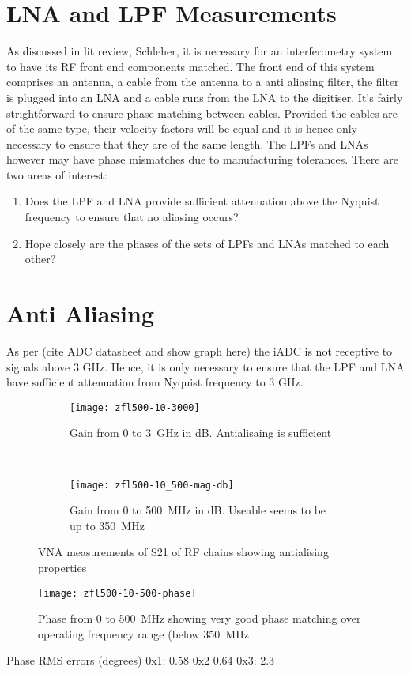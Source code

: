 \section{LNA and LPF Measurements}
As discussed in lit review, Schleher, it is necessary for an interferometry system to have its RF front end components matched. The front end of this system comprises an antenna, a cable from the antenna to a anti aliasing filter, the filter is plugged into an LNA and a cable runs from the LNA to the digitiser. 
It's fairly strightforward to ensure phase matching between cables. Provided the cables are of the same type, their velocity factors will be equal and it is hence only necessary to ensure that they are of the same length.
The LPFs and LNAs however may have phase mismatches due to manufacturing tolerances. 
There are two areas of interest:
\begin{enumerate}
  \item Does the LPF and LNA provide sufficient attenuation above the Nyquist frequency to ensure that no aliasing occurs?
  \item Hope closely are the phases of the sets of LPFs and LNAs matched to each other?
\end{enumerate}

\section{Anti Aliasing}
As per (cite ADC datasheet and show graph here) the iADC is not receptive to signals above 3 GHz. Hence, it is only necessary to ensure that the LPF and LNA have sufficient attenuation from Nyquist frequency to 3 GHz. 

\begin{figure}
  \centering
  \begin{subfigure}{\textwidth}
    \centering
    \texttt{[image: zfl500-10-3000]}
    \caption{Gain from 0 to \SI{3}{\giga\hertz} in dB. Antialisaing is sufficient}
  \end{subfigure}\\[1em]
  \begin{subfigure}{\textwidth}
    \centering
    \texttt{[image: zfl500-10\_500-mag-db]}
    \caption{Gain from 0 to \SI{500}{\mega\hertz} in dB. Useable seems to be up to \SI{350}{\mega\hertz}}
  \end{subfigure}
  \caption{VNA measurements of S21 of RF chains showing antialising properties}
\end{figure}
\begin{figure}
  \centering
  \texttt{[image: zfl500-10-500-phase]}
  \caption{Phase from 0 to \SI{500}{\mega\hertz} showing very good phase matching over operating frequency range (below \SI{350}{\mega\hertz}}
\end{figure}

Phase RMS errors (degrees)
0x1: 0.58
0x2 0.64
0x3: 2.3
